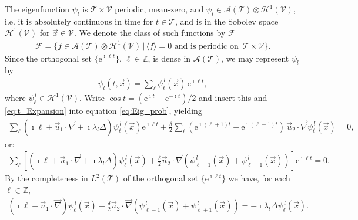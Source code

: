\documentclass{article}
\newcommand{\e}{\mathrm{e}}
\newcommand{\Hc}{\mathcal{H}}
\newcommand{\Ac}{\mathcal{A}}
\newcommand{\Tc}{\mathcal{T}}
\newcommand{\Vc}{\mathcal{V}}
\newcommand{\Fc}{\mathcal{F}}
\newcommand{\0}{\mathbf{0}}
\newcommand{\1}{\mathbf{1}}
\newcommand{\2}{\mathbf{2}}
\newcommand{\3}{\mathbf{3}}
\newcommand{\4}{\mathbf{4}}
\newcommand{\5}{\mathbf{5}}
\newcommand{\6}{\mathbf{6}}
\newcommand{\7}{\mathbf{7}}
\newcommand{\8}{\mathbf{8}}
\begin{document}
The eigenfunction $\psi_l$ is $\Tc\times\Vc$ periodic, mean-zero, and
$\psi_l\in\Ac(\Tc)\otimes\Hc^1(\Vc)$, i.e. it is absolutely continuous in time
for $t\in\Tc$, and is in the Sobolev space $\Hc^1(\Vc)$ for
$\vec{x}\in\Vc$. We denote the class of such functions by $\Fc$
%
\begin{align}\label{eq:F}
  \Fc=\{f\in\Ac(\Tc)\otimes\Hc^1(\Vc)\,|\, \langle f\rangle=0  \text{ and is periodic on }
  \, \Tc\times\Vc\}. 
\end{align}
%
Since the orthogonal set $\{\e^{\imath\ell t}\}$,
${\ell\in\mathbb{Z}}$, is dense in $\Ac(\Tc)$, we may represent $\psi_l$ by 
%
\begin{align}\label{eq:t_Expansion}
  \psi_l(t,\vec{x})=\sum_\ell\psi_\ell^{\,l}(\vec{x})\,\e^{\imath \ell t},
\end{align}
%
where $\psi_\ell^{\,l}\in\Hc^1(\Vc)$. Write $\cos{t}=(\e^{\imath t}+\e^{-\imath t})/2$ and insert
this and \eqref{eq:t_Expansion} into equation \eqref{eq:Eig_prob},
yielding   
%
\begin{align}
  \sum_\ell(\imath \ell + \vec{u}_1\cdot\vec{\nabla}+\imath\lambda_l\Delta)\psi_\ell^{\,l}(\vec{x})\e^{\imath \ell t}
 +\frac{\delta}{2}\sum_\ell(\e^{\imath(\ell+1)t}+\e^{\imath(\ell-1)t})\,\vec{u}_2\cdot\vec{\nabla}\psi_\ell^{\,l}(\vec{x})=0,
\end{align}
%
or:
%
\begin{align}
  \sum_\ell\left[(\imath \ell + \vec{u}_1\cdot\vec{\nabla}+\imath\lambda_l\Delta)\psi_\ell^{\,l}(\vec{x})
 +\frac{\delta}{2}\vec{u}_2\cdot\vec{\nabla}(\psi^{\,l}_{\ell-1}(\vec{x})+\psi^{\,l}_{\ell+1}(\vec{x}))\right]\e^{\imath \ell t}=0.
\end{align}
%
By the completeness in $L^2(\Tc)$ of the orthogonal set $\{\e^{\imath \ell t}\}$ we
have, for each $\ell\in\mathbb{Z}$, 
%
\begin{align}\label{eq:Eig_prob_shift}
  (\imath \ell + \vec{u}_1\cdot\vec{\nabla})\psi_\ell^{\,l}(\vec{x})
 +\frac{\delta}{2}\vec{u}_2\cdot\vec{\nabla}(\psi_{\ell-1}^{\,l}(\vec{x})+\psi_{\ell+1}^{\,l}(\vec{x}))
 =-\imath\lambda_l\Delta\psi_\ell^{\,l}(\vec{x}).
\end{align}
%
\end{document}
